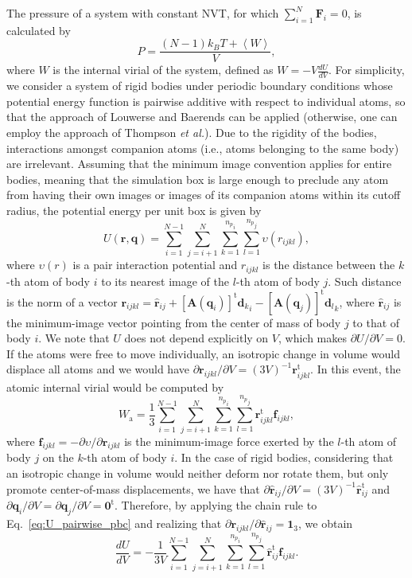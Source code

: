 \documentclass[aip,jcp,reprint,amsmath,amssymb]{revtex4-1}
\newcommand{\mt}[1]{\boldsymbol{\mathbf{#1}}}           %
\newcommand{\vt}[1]{\boldsymbol{\mathbf{#1}}}           %
\newcommand{\tr}[1]{#1^\text{t}}                        %
\begin{document}
The pressure of a system with constant NVT, for which $\sum_{i=1}^N{\vt F}_i = 0$, is calculated by\cite{Louwerse2006, Tuckerman2001}
\[
P = \frac{(N-1) k_B T + \left\langle W \right\rangle}{V},
\]
where $W$ is the internal virial of the system, defined as $W = - V \frac{dU}{dV}$. For simplicity, we consider a system of rigid bodies under periodic boundary conditions whose potential energy function is pairwise additive with respect to individual atoms, so that the approach of Louwerse and Baerends\cite{Louwerse2006} can be applied (otherwise, one can employ the approach of Thompson \textit{et al.}\cite{Thompson2009}). Due to the rigidity of the bodies, interactions amongst companion atoms (i.e., atoms belonging to the same body) are irrelevant. Assuming that the minimum image convention\cite{Allen1989} applies for entire bodies, meaning that the simulation box is large enough to preclude any atom from having their own images or images of its companion atoms within its cutoff radius, the potential energy per unit box is given by
\begin{equation}
\label{eq:U_pairwise_pbc}
U({\vt r}, {\vt q}) = \sum_{i=1}^{N-1} \sum_{j=i+1}^N \sum_{k=1}^{{n_p}_i} \sum_{l=1}^{{n_p}_j} \upsilon(r_{ijkl}),
\end{equation}
where $\upsilon(r)$ is a pair interaction potential and $r_{ijkl}$ is the distance between the $k$-th atom of body $i$ to its nearest image of the $l$-th atom of body $j$. Such distance is the norm of a vector ${\vt r}_{ijkl} = \hat{\vt r}_{ij} + \tr{[{\mt A}({\vt q}_i)]}{{\vt d}_k}_i - \tr{[{\mt A}({\vt q}_j)]}{{\vt d}_l}_k$, where $\hat{\vt r}_{ij}$ is the minimum-image vector pointing from the center of mass of body $j$ to that of body $i$. We note that $U$ does not depend explicitly on $V$, which makes ${\partial U}/{\partial V} = 0$. If the atoms were free to move individually, an isotropic change in volume would displace all atoms and we would have ${\partial {\vt r}_{ijkl}}/{\partial V} = (3V)^{-1} \tr{\vt r}_{ijkl}$.\cite{Louwerse2006} In this event, the atomic internal virial would be computed by
\begin{equation}
\label{eq:virial_atoms}
W_\text{a} = \frac{1}{3} \sum_{i=1}^{N-1} \sum_{j=i+1}^N \sum_{k=1}^{{n_p}_i} \sum_{l=1}^{{n_p}_j} \tr{\vt r}_{ijkl} {\vt f}_{ijkl},
\end{equation}
where $\vt f_{ijkl} = -{\partial \upsilon}/{\partial \vt r_{ijkl}}$ is the minimum-image force exerted by the $l$-th atom of body $j$ on the $k$-th atom of body $i$. In the case of rigid bodies, considering that an isotropic change in volume would neither deform nor rotate them, but only promote center-of-mass displacements, we have that ${\partial \hat{\vt r}_{ij}}/{\partial V} = (3V)^{-1} \tr{\hat{\vt r}}_{ij}$ and ${\partial {\vt q}_i}/{\partial V} = {\partial {\vt q}_j}/{\partial V} = \tr{\vt 0}$. Therefore, by applying the chain rule to Eq.~\ref{eq:U_pairwise_pbc} and realizing that $\partial \vt r_{ijkl}/\partial \hat{\vt r}_{ij} = \vt 1_3$, we obtain
\[
\label{eq:dUdV_rigid_bodies}
\frac{dU}{dV} = -\frac{1}{3V} \sum_{i=1}^{N-1} \sum_{j=i+1}^N \sum_{k=1}^{{n_p}_i} \sum_{l=1}^{{n_p}_j} \tr{\hat{\vt r}}_{ij} \vt f_{ijkl}.
\]
\end{document}
